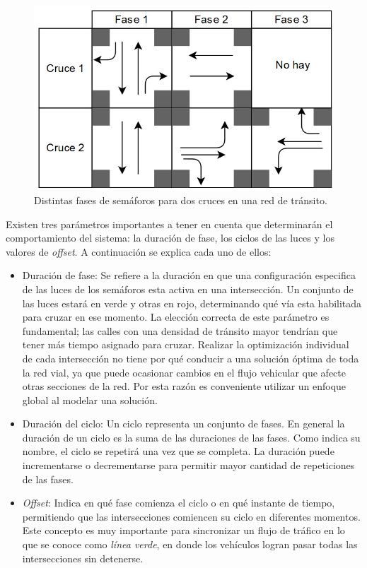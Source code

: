 \begin{figure}[H]
	\centering
	\includegraphics[width=0.8\linewidth]{Figures/fases1}
	\caption{Distintas fases de semáforos para dos cruces en una red de tránsito.}
	\label{fig:fases}
\end{figure}

Existen tres parámetros importantes a tener en cuenta que determinarán el comportamiento del sistema: la duración de fase, los ciclos de las luces y los valores de \emph{offset}. 
A continuación se explica cada uno de ellos:


\begin{itemize}
 	\item Duración de fase: Se refiere a la duración en que una configuración especifica de las luces de los semáforos esta activa en una intersección. Un conjunto de las luces estará en verde y otras en rojo, determinando qué vía esta habilitada para cruzar en ese momento. La elección correcta de este parámetro es fundamental; las calles con una densidad de tránsito mayor tendrían que tener más tiempo asignado para cruzar. Realizar la optimización individual de cada intersección no tiene por qué conducir a una solución óptima de toda la red vial, ya que puede ocasionar cambios en el flujo vehicular que afecte otras secciones de la red. Por esta razón es conveniente utilizar un enfoque global al modelar una solución.
 	
 	\item Duración del ciclo: Un ciclo representa un conjunto de fases. En general la duración de un ciclo es la suma de las duraciones de las fases. Como indica su nombre, el ciclo se repetirá una vez que se completa. La duración puede incrementarse o decrementarse para permitir mayor cantidad de repeticiones de las fases.
 	
 	\item \emph{Offset}: Indica en qué fase comienza el ciclo o en qué instante de tiempo, permitiendo que las intersecciones comiencen su ciclo en diferentes momentos. Este concepto es muy importante para sincronizar un flujo de tráfico en lo que se conoce como \emph{línea verde}, en donde los vehículos logran pasar todas las intersecciones sin detenerse.
\end{itemize}

